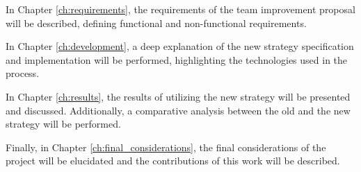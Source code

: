 In Chapter \ref{ch:requirements}, the requirements of the team improvement proposal will be described, defining functional and non-functional requirements.

In Chapter \ref{ch:development}, a deep explanation of the new strategy specification and implementation will be performed, highlighting the technologies used in the process.

In Chapter \ref{ch:results}, the results of utilizing the new strategy will be presented and discussed. Additionally, a comparative analysis between the old and the new strategy will be performed.

Finally, in Chapter \ref{ch:final_considerations}, the final considerations of the project will be elucidated and the contributions of this work will be described.
